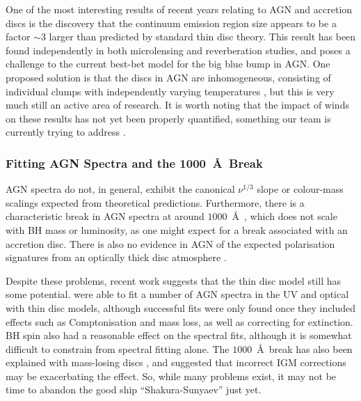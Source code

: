 One of the most interesting results of recent years relating to AGN and accretion discs is
the discovery that the continuum emission region size appears to be
a factor $\sim3$ larger than predicted by standard thin disc theory. This result
has been found independently in both microlensing \citep{morgan2010,dai2010} 
and reverberation \citep{edelson2015} studies, and poses a challenge to the 
current best-bet model for the big blue bump in AGN. 
One proposed solution is that the discs in AGN are inhomogeneous,
consisting of individual clumps with independently
varying temperatures \citep{dexteragol2011}, but this is very much
still an active area of research. It is worth noting that the impact
of winds on these results has not yet been properly quantified, something
our team is currently trying to address \citep{mangham}.

\subsubsection{Fitting AGN Spectra and the 1000~\AA\ Break}

AGN spectra do not, in general, exhibit the canonical $\nu^{1/3}$ slope
\citep[e.g.][]{koratkar1999,davis2007,shankar2016}
or colour-mass scalings \citep{bonning2007} 
expected from theoretical predictions. 
Furthermore, there is a characteristic break in AGN spectra at
around $1000$~\AA\ \citep{lusso2015}, which does not scale with BH mass or luminosity,
as one might expect for a break associated with an accretion disc. 
There is also no evidence in AGN of the expected polarisation signatures from an 
optically thick disc atmosphere \citep{stockman1979,antonucci1988,antonucci1996}. 

Despite these problems, recent work suggests that the thin disc model 
still has some potential. \cite{capellupo2015} were able to fit a number of
AGN spectra in the UV and optical with thin disc models, although successful fits
were only found once they included effects such as Comptonisation and mass loss,
as well as correcting for extinction. BH spin also had a reasonable effect on the 
spectral fits, although it is somewhat difficult to constrain from spectral 
fitting alone. The $1000$~\AA\ break has also been explained with mass-losing discs 
\citep{laordavis2014},
and \cite{lusso2015} suggested that incorrect IGM corrections 
may be exacerbating the effect.
So, while many problems exist, it may not be time to 
abandon the good ship ``Shakura-Sunyaev'' just yet.

